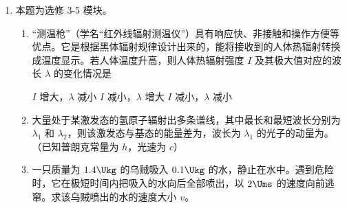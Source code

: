 \documentclass[\gkver]{gaokaozhenti}
\begin{document}
\begin{enumerate}
\begin{enumerate}
\item
在某次实验中，小明释放小球时手稍有晃动，视频显示小球下落时偏离了竖直方向。从该视频中截取图片，（选填“仍能”或“不能”）用（3）问中的方法测出重力加速度。
\end{enumerate}



\item
本题为选修 3-5 模块。

\begin{enumerate}
\item
“测温枪”（学名“红外线辐射测温仪”）具有响应快、非接触和操作方便等优点。它是根据黑体辐射规律设计出来的，能将接收到的人体热辐射转换成温度显示。若人体温度升高，则人体热辐射强度 $I$ 及其极大值对应的波长 $\lambda$ 的变化情况是

{$I$ 增大，$\lambda$ 减小}
{$I$ 减小，$\lambda$ 增大}
{$I$ 减小，$\lambda$ 减小}
\item
大量处于某激发态的氢原子辐射出多条谱线，其中最长和最短波长分别为 $\lambda_{1}$ 和 $\lambda_{2}$，则该激发态与基态的能量差为，波长为 $\lambda_{1}$ 的光子的动量为。（已知普朗克常量为 $h$，光速为 $c$）
\item
一只质量为 $1.4\Ukg$ 的乌贼吸入 $0.1\Ukg$ 的水，静止在水中。遇到危险时，它在极短时间内把吸入的水向后全部喷出，以 $2\Ums$ 的速度向前逃窜。求该乌贼喷出的水的速度大小 $v$。
\end{enumerate}


\end{enumerate}
\end{document}
